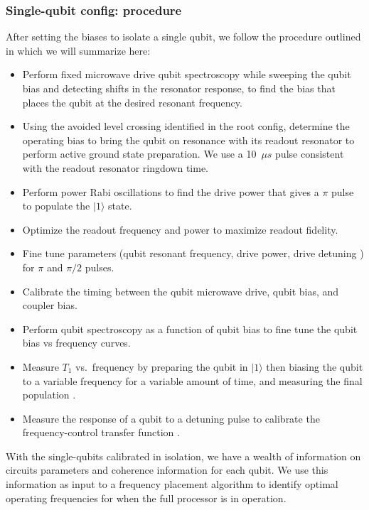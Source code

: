 \subsubsection{Single-qubit config: procedure}
After setting the biases to isolate a single qubit, we follow the procedure outlined in \cite{chen2018metrology} which we will summarize here:
\begin{itemize}
\item Perform fixed microwave drive qubit spectroscopy while sweeping the qubit bias and detecting shifts in the resonator response, to find the bias that places the qubit at the desired resonant frequency.
\item Using the avoided level crossing identified in the root config, determine the operating bias to bring the qubit on resonance with its readout resonator to perform active ground state preparation. We use a 10~$\mu s$ pulse consistent with the readout resonator ringdown time.
\item Perform power Rabi oscillations to find the drive power that gives a $\pi$ pulse to populate the $|1\rangle$ state.
\item Optimize the readout frequency and power to maximize readout fidelity.
\item Fine tune parameters (qubit resonant frequency, drive power, drive detuning \cite{chen2016measuring}) for $\pi$ and $\pi/2$ pulses.
\item Calibrate the timing between the qubit microwave drive, qubit bias, and coupler bias.
\item Perform qubit spectroscopy as a function of qubit bias to fine tune the qubit bias vs frequency curves.
\item Measure $T_1$ vs.\ frequency by preparing the qubit in $|1\rangle$ then biasing the qubit to a variable frequency for a variable amount of time, and measuring the final population \cite{paultls}.
\item Measure the response of a qubit to a detuning pulse to calibrate the frequency-control transfer function \cite{kelly2014optimal, neill2018blueprint, chen2018metrology}.
\end{itemize}

With the single-qubits calibrated in isolation, we have a wealth of information on circuits parameters and coherence information for each qubit. We use this information as input to a frequency placement algorithm to identify optimal operating frequencies for when the full processor is in operation. 

